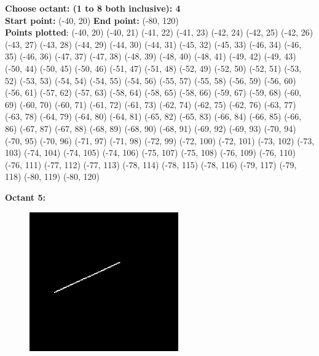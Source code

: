 \documentclass[12pt,letterpaper]{article}
\begin{document}
\textbf{Choose octant: (1 to 8 both inclusive): 4}\\
\textbf{Start point:} (-40, 20)
\textbf{End point:} (-80, 120)\\
\textbf{Points plotted}:
(-40, 20) (-40, 21) (-41, 22) (-41, 23) 
(-42, 24) (-42, 25) (-42, 26) (-43, 27) 
(-43, 28) (-44, 29) (-44, 30) (-44, 31) 
(-45, 32) (-45, 33) (-46, 34) (-46, 35) 
(-46, 36) (-47, 37) (-47, 38) (-48, 39) 
(-48, 40) (-48, 41) (-49, 42) (-49, 43) 
(-50, 44) (-50, 45) (-50, 46) (-51, 47) 
(-51, 48) (-52, 49) (-52, 50) (-52, 51) 
(-53, 52) (-53, 53) (-54, 54) (-54, 55) 
(-54, 56) (-55, 57) (-55, 58) (-56, 59) 
(-56, 60) (-56, 61) (-57, 62) (-57, 63) 
(-58, 64) (-58, 65) (-58, 66) (-59, 67) 
(-59, 68) (-60, 69) (-60, 70) (-60, 71) 
(-61, 72) (-61, 73) (-62, 74) (-62, 75) 
(-62, 76) (-63, 77) (-63, 78) (-64, 79) 
(-64, 80) (-64, 81) (-65, 82) (-65, 83) 
(-66, 84) (-66, 85) (-66, 86) (-67, 87) 
(-67, 88) (-68, 89) (-68, 90) (-68, 91) 
(-69, 92) (-69, 93) (-70, 94) (-70, 95) 
(-70, 96) (-71, 97) (-71, 98) (-72, 99) 
(-72, 100) (-72, 101) (-73, 102) (-73, 103) 
(-74, 104) (-74, 105) (-74, 106) (-75, 107) 
(-75, 108) (-76, 109) (-76, 110) (-76, 111) 
(-77, 112) (-77, 113) (-78, 114) (-78, 115) 
(-78, 116) (-79, 117) (-79, 118) (-80, 119) 
(-80, 120) 


\newpage
\textbf{Octant 5:}
\begin{figure}[h]
    \centering
    \includegraphics[height=6cm]{Outputs/O5-1.png}
\end{figure}
\end{document}
